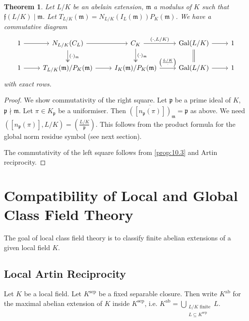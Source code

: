 \documentclass[11pt]{article}
\theoremstyle{definition}
\theoremstyle{plain}
\newtheorem{theorem}[definition]{Theorem}
\theoremstyle{remark}
\DeclareMathOperator{\Gal}{Gal}
\newcommand{\ff}{\mathfrak{f}}
\newcommand{\fp}{\mathfrak{p}}
\newcommand{\fm}{\mathfrak{m}}
\newcommand{\ab}{\mathrm{ab}}
\newcommand{\sep}{\mathrm{sep}}
\begin{document}
\begin{theorem}\label{thm:10_4}
    Let $L/K$ be an abelain extension, $\fm$ a modulus of $K$ such that $\ff(L/K) \mid \fm$. Let $T_{L/K}(\fm) = N_{L/K}(I_L(\fm)) P_K(\fm)$. We have a commutative diagram
    \begin{equation*}
    \begin{tikzcd}
        1 \arrow[r] & N_{L/K}(C_L) \arrow[r] \arrow[d, twoheadrightarrow, "(\cdot)_\fm"] & C_K \arrow[r, "(\cdot{,} L/K)"] \arrow[d, twoheadrightarrow, "(\cdot)_\fm"] & \Gal(L/K) \arrow[r] \arrow[d, equal] & 1\\
        1 \arrow[r] & T_{L/K}(\fm) / P_K(\fm) \arrow[r] & I_K(\fm)/P_K(\fm) \arrow[r, "\left(\frac{L/K}{\cdot}\right)"] & \Gal(L/K) \arrow[r] & 1
    \end{tikzcd}
    \end{equation*}
    with exact rows.
\end{theorem}
\begin{proof}
    We show commutativity of the right square. Let $\fp$ be a prime ideal of $K$, $\fp \nmid \fm$. Let $\pi \in K_\fp$ be a uniformiser. Then $\overline{([n_\fp(\pi)])}_\fm = \fp$ as above. We need $([n_\fp(\pi)], L/K) = \left(\frac{L/K}{\fp}\right)$. This follows from the product formula for the global norm residue symbol (see next section).

    The commutativity of the left square follows from \autoref{prop:10.3} and Artin reciprocity.
\end{proof}

\section{Compatibility of Local and Global Class Field Theory}

The goal of local class field theory is to classify finite abelian extensions of a given local field $K$.

\subsection{Local Artin Reciprocity}

Let $K$ be a local field. Let $K^\sep$ be a fixed separable closure. Then write $K^\ab$ for the maximal abelian extension of $K$ inside $K^\sep$, i.e. $K^\ab = \bigcup_{\substack{L/K \text{ finite} \\ L \subseteq K^\sep}} L$.
\end{document}
